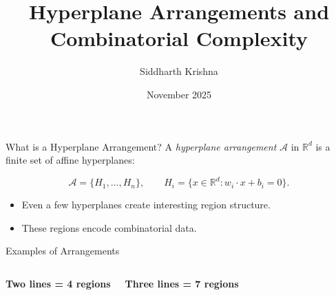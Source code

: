 \documentclass{beamer}
\title{Hyperplane Arrangements and Combinatorial Complexity}
\author{Siddharth Krishna}
\date{November 2025}
\begin{document}
\frame{\titlepage}

\begin{frame}{What is a Hyperplane Arrangement?}
A \emph{hyperplane arrangement} $\mathcal A$ in $\mathbb{R}^d$ is a finite set of affine hyperplanes:

\[
\mathcal A = \{ H_1,\dots, H_n \}, \qquad
H_i = \{x \in \mathbb R^d : w_i \cdot x + b_i = 0\}.
\]

\begin{center}
\end{center}

\begin{itemize}
  \item Even a few hyperplanes create interesting region structure.
  \item These regions encode combinatorial data.
\end{itemize}
\end{frame}

\begin{frame}{Examples of Arrangements}
\begin{columns}
\begin{center}
\textbf{Two lines = 4 regions}
\end{center}

\begin{center}
\textbf{Three lines = 7 regions}
\end{center}
\end{columns}
\end{frame}
\end{document}
